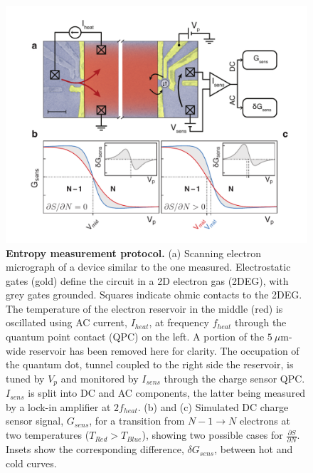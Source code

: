 \documentclass[twocolumn,showpacs,amsmath,amssymb,prl,aps,superscriptaddress]{revtex4-1}
\begin{document}
\begin{figure}[!]
        \includegraphics[width=1.0\columnwidth]{../figures/figure_1_annotated.pdf}
        \caption{\label{fig:fig1} \textbf{Entropy measurement protocol.}  (a) Scanning electron micrograph of a device similar to the one measured. Electrostatic gates (gold) define the circuit in a 2D electron gas (2DEG), with grey gates grounded. Squares indicate ohmic contacts to the 2DEG.  The temperature of the electron reservoir in the middle (red) is oscillated using AC current, $I_{heat}$, at frequency $f_{heat}$ through the quantum point contact (QPC) on the left.  A portion of the $5~\mu$m-wide reservoir has been removed here for clarity.  The occupation of the quantum dot, tunnel coupled to the right side the reservoir, is tuned by $V_p$ and monitored by $I_{sens}$ through the charge sensor QPC. $I_{sens}$ is split into DC and AC components, the latter being measured by a lock-in amplifier at $2f_{heat}$.  (b) and (c) Simulated DC charge sensor signal, $G_{sens}$, for a transition from $N-1 \rightarrow N$ electrons at two temperatures ($T_{Red} > T_{Blue}$), showing two possible cases for $\frac{\partial S}{\partial N}$. Insets show the corresponding difference, $\delta G_{sens}$, between hot and cold curves.}
\end{figure}
\end{document}
